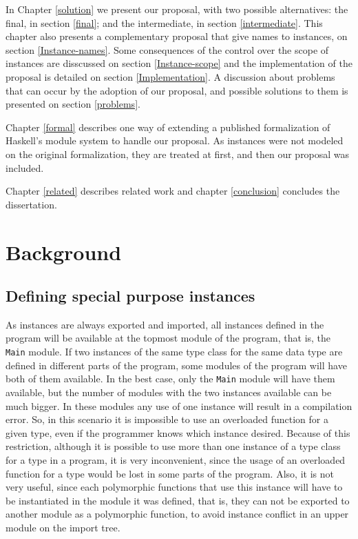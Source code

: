 \documentclass[msc]{ppgccufmg}
\begin{document}
In Chapter \ref{solution} we present our
proposal, with two possible alternatives: the final, in section \ref{final}; and the intermediate, in section \ref{intermediate}.
This chapter also presents a complementary proposal that give names to instances, on section \ref{Instance-names}.
Some consequences of the control over the scope of instances are disscussed on section \ref{Instance-scope} and the implementation of the proposal is detailed on section \ref{Implementation}.
A discussion about problems that can occur by the adoption of our proposal, and possible solutions to them is presented on section \ref{problems}.

Chapter \ref{formal} describes one way of extending a published
formalization of Haskell's module system \citep{formal} to handle our proposal.
As instances were not modeled on the original formalization, they are treated at first, and then our proposal was included.

Chapter \ref{related} describes related work and chapter \ref{conclusion} concludes the dissertation.

\chapter{Background}
\label{Background}

\section{Defining special purpose instances}
\label{Special-purpose-instances}

As instances are always exported and imported, all instances defined in the
program will be available at the topmost module of the program, that is, the
\texttt{Main} module.  If two instances of the same type class for the same
data type are defined in different parts of the program, some modules of the
program will have both of them available.  In the best case, only the
\texttt{Main} module will have them available, but the number of modules with
the two instances available can be much bigger.  In these modules any use of
one instance will result in a
compilation error.  So, in this scenario it is impossible to use an overloaded
function for a given type, even if the programmer knows which instance desired.  Because of this restriction, although it is possible
to use more than one instance of a type class for a type in a program, it is
very inconvenient, since the usage of an overloaded function for a type would be
lost in some parts of the program.  Also, it is not very useful, since each polymorphic
  functions that use this instance will have to be instantiated in the module it was defined, that is, they can not be exported to another module as a polymorphic function,
  to avoid instance conflict in an upper module on the import tree.
\end{document}
